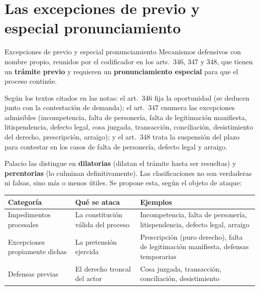 \documentclass[12pt,oneside]{book}
\renewcommand{\arraystretch}{1.15}
\begin{document}
\section{Las excepciones de previo y especial pronunciamiento}

\begin{definition}{Excepciones de previo y especial pronunciamiento}
Mecanismos defensivos con nombre propio, reunidos por el codificador en los arts.~346, 347 y 348, que tienen un \textbf{trámite previo} y requieren un \textbf{pronunciamiento especial} para que el proceso continúe.
\end{definition}

Según los textos citados en las notas: el art.~346 fija la oportunidad (se deducen junto con la contestación de demanda); el art.~347 enumera las excepciones admisibles (incompetencia, falta de personería, falta de legitimación manifiesta, litispendencia, defecto legal, cosa juzgada, transacción, conciliación, desistimiento del derecho, prescripción, arraigo); y el art.~348 trata la suspensión del plazo para contestar en los casos de falta de personería, defecto legal y arraigo. %

Palacio las distingue en \textbf{dilatorias} (dilatan el trámite hasta ser resueltas) y \textbf{perentorias} (lo culminan definitivamente). Las clasificaciones no son verdaderas ni falsas, sino más o menos útiles. Se propone esta, según el objeto de ataque:

\begin{table}[H]
\centering
\renewcommand{\arraystretch}{1.25}
\begin{tabularx}{\textwidth}{>{\RaggedRight\arraybackslash}p{}>{\RaggedRight\arraybackslash}p{}>{\RaggedRight\arraybackslash}X}
\toprule
\textbf{Categoría} & \textbf{Qué se ataca} & \textbf{Ejemplos} \\
\midrule
Impedimentos procesales & La constitución válida del proceso & Incompetencia, falta de personería, litispendencia, defecto legal, arraigo \\
Excepciones propiamente dichas & La pretensión ejercida & Prescripción (puro derecho), falta de legitimación manifiesta, defensas temporarias \\
Defensas previas & El derecho troncal del actor & Cosa juzgada, transacción, conciliación, desistimiento \\
\bottomrule
\end{tabularx}
\end{table}
\end{document}
